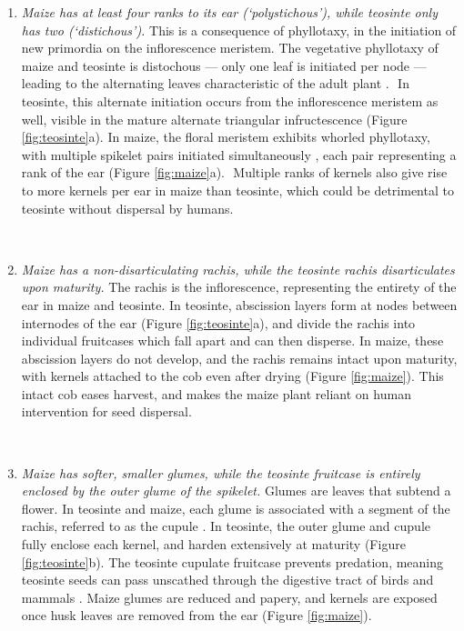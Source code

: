 \documentclass[9pt,twocolumn,twoside]{rilabRxiv}
\begin{document}
\begin{enumerate}
﻿ \item \textit{Maize has at least four ranks to its ear (`polystichous'), while teosinte only has two (`distichous').}
 This is a consequence of phyllotaxy, in the initiation of new primordia on the inflorescence meristem.
 The vegetative phyllotaxy of maize and teosinte is distochous --- only one leaf is initiated per node --- leading to the alternating leaves characteristic of the adult plant \citep{jackson1999}.
 ﻿ In teosinte, this alternate initiation occurs from the inflorescence meristem as well, visible in the mature alternate triangular infructescence \citep{sundberg1990} (Figure \ref{fig:teosinte}a).
 In maize, the floral meristem exhibits whorled phyllotaxy, with multiple spikelet pairs initiated simultaneously \citep{bartlett2014}, each ﻿pair representing a rank of the ear (Figure \ref{fig:maize}a).
 ﻿ Multiple ranks of kernels also give rise to more kernels per ear in maize than teosinte, which could be detrimental to teosinte without dispersal by humans. 

﻿ \item \textit{Maize has a non-disarticulating rachis, while the teosinte rachis disarticulates upon maturity.}
 The rachis is the inflorescence, representing the entirety of the ear in maize and teosinte.
 In teosinte, abscission layers form at nodes between internodes of the ear (Figure \ref{fig:teosinte}a), and divide the rachis into individual fruitcases which fall apart and can then disperse.
 In maize, these abscission layers do not develop, and the rachis remains intact upon maturity, with kernels attached to the cob even after drying \citep{iltis2000, chavez2012} (Figure \ref{fig:maize}).
 This intact cob eases harvest, and makes the maize plant reliant on human intervention for seed dispersal.

﻿ \item \textit{Maize has softer, smaller glumes, while the teosinte fruitcase is entirely enclosed by the outer glume of the spikelet.}
 Glumes are leaves that subtend a flower.
 In teosinte and maize, each glume is associated with a segment of the rachis, referred to as the cupule \citep{dorweiler1997}.
In teosinte, the outer glume and cupule fully enclose each kernel, and harden extensively at maturity (Figure \ref{fig:teosinte}b).
 The teosinte cupulate fruitcase prevents predation, meaning teosinte seeds can pass unscathed through the digestive tract of birds and mammals \citep{wilkes1967}.
 Maize glumes are reduced and papery, and kernels are exposed once husk leaves are removed from the ear (Figure \ref{fig:maize}).


\end{enumerate}
\end{document}
